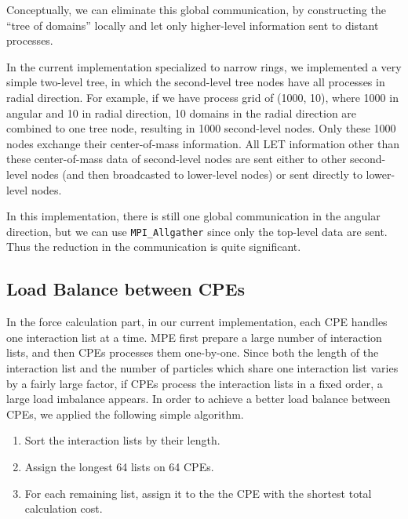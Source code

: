\documentclass[oribibl]{llncs}
\begin{document}
Conceptually, we can eliminate this global communication, by
constructing the ``tree of domains'' locally and let only higher-level
information sent to distant processes.

In the current implementation specialized to narrow rings, we
implemented a very simple two-level tree, in which the second-level
tree nodes have all processes in radial direction. For example, if we
have process grid of (1000, 10), where 1000 in angular and 10 in
radial direction, 10 domains in the radial direction are combined to
one tree node, resulting in 1000 second-level nodes. Only these 1000
nodes exchange their center-of-mass information. All LET information
other than these center-of-mass data of second-level nodes are sent
either to other second-level nodes (and then broadcasted to
lower-level nodes) or sent directly to lower-level nodes.

In this implementation, there is still one global communication in the
angular direction, but we can use {\tt MPI\_Allgather} since only the
top-level data are sent. Thus the reduction in the communication is
quite significant.


\subsection{Load Balance between CPEs}
\label{subsec:force}

In the force calculation part, in our current implementation, each CPE
handles one interaction list at a time. MPE first prepare a large
number of interaction lists, and then CPEs processes them
one-by-one. Since both the length of the interaction list and the
number of particles which share one interaction list varies by a
fairly large factor, if CPEs process the interaction lists in a fixed
order, a large load imbalance appears. In order to achieve a better
load balance between CPEs, we applied the following simple algorithm.

\begin{enumerate}
  
\item Sort the interaction lists by their length.

\item Assign the longest 64 lists on 64 CPEs.

\item For each remaining list, assign it to the the CPE with the
  shortest total calculation cost.
  
\end{enumerate}
\end{document}

